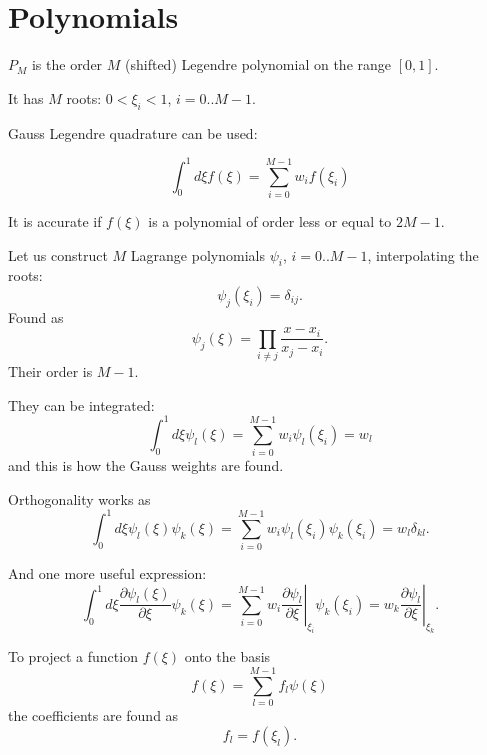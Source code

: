 \documentclass[a5paper]{article}
\newcommand{\D}[2]{\frac{\partial #1}{\partial #2}}
\begin{document}

\section{Polynomials}

$P_M$ is the order $M$ (shifted) Legendre polynomial on the range $[0,1]$.

It has $M$ roots: $0<\xi_i<1$, $i=0..M-1$.

Gauss Legendre quadrature can be used:

\begin{equation} \label{eq:gaussq}
  \int_0^1 d\xi f(\xi) = \sum_{i=0}^{M-1} w_i f(\xi_i) 
\end{equation}

It is accurate if $f(\xi)$ is a polynomial of order less or equal to $2M-1$. 

Let us construct $M$ Lagrange polynomials $\psi_i$, $i=0..M-1$, interpolating the roots:
\begin{equation}
  \psi_j(\xi_i) = \delta_{ij}.
\end{equation}
Found as
\begin{equation}
  \psi_j(\xi) = \prod_{i\ne j} \frac{x-x_i}{x_j-x_i}.
\end{equation}
Their order is $M-1$.

They can be integrated:
\begin{equation}
  \int_0^1 d\xi \psi_l(\xi) = \sum_{i=0}^{M-1} w_i \psi_l(\xi_i)  = w_l
\end{equation}
and this is how the Gauss weights are found. 

Orthogonality works as
\begin{equation}
  \int_0^1 d\xi \psi_l(\xi) \psi_k(\xi) = \sum_{i=0}^{M-1} w_i \psi_l(\xi_i) \psi_k(\xi_i) = w_l \delta_{kl}.
\end{equation}

And one more useful expression:
\begin{equation}
  \int_0^1 d\xi \D{\psi_l(\xi)}\xi \psi_k(\xi) = \sum_{i=0}^{M-1} w_i \left. \D{\psi_l}{\xi}\right|_{\xi_i} \psi_k(\xi_i) = w_k \left. \D{\psi_l}{\xi}\right|_{\xi_k}.
\end{equation}

To project a function $f(\xi)$ onto the basis
\begin{equation}
  f(\xi) = \sum_{l=0}^{M-1} f_l \psi(\xi) 
\end{equation}
the coefficients are found as
\begin{equation}
  \label{eq:takerootvalue}
  f_l = f(\xi_l).
\end{equation}
\end{document}

